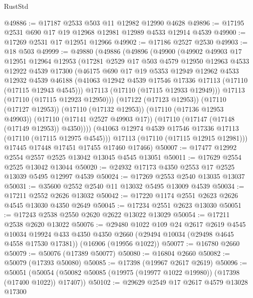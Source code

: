 \begin{lexlean}{RustStd}
\begin{coremodule}
@49886 := @17187 @2533 @503 @11 @12982 @12990 @4628
@49896 := @17195 @2531 @690 @17 @19 @12968 @12981 @12989 @4533 @12914 @4539
@49900 := @17269 @2531 @17 @12951 @12966
@49902 := @17186 @2527 @2530
@49903 := @18 @503
@49999 := @49880
    (@49886
      (@49896
        (@49900
          (@49902
            @49903
            @17
            @12951
            @12964
            @12953
            (@17281
              @2529
              @17
              @503
              @4579
              @12950
              @12963
              @4533
              @12922
              @4539
              @17300
              (@46175
                @690
                @17
                @19
                @5353
                @12949
                @12962
                @4533
                @12932
                @4539
                @46188
                (@41063 @12942 @4539 @17546 @17336 @17113 (@17110 (@17115 @12943 @4545)))
                @17113
                (@17110 (@17115 @12933 @12949)))
              @17113
              (@17110 (@17115 @12923 @12950)))
            (@17122 (@17123 @12953))
            (@17110 (@17127 @12953))
            (@17110 (@17132 @12953))
            (@17110 (@17136 @12953 @49903))
            (@17110 (@17141 @2527 @49903 @17))
            (@17110 (@17147 (@17148 (@17149 @12953)) @4350))))
        (@41063 @12974 @4539 @17546 @17336 @17113 (@17110 (@17115 @12975 @4545)))
        @17113
        (@17110 (@17115 @12915 @12981)))
      @17445
      @17448
      @17451
      @17455
      @17460
      @17466)
@50007 := @17477 @12992 @2554 @2557 @2525 @13042 @13045 @4545 @13051
@50011 := @17629 @2554 @2525 @13042 @13044
@50020 := @24932 @17173 @4350 @2553 @17 @2525 @13039 @5495 @12997 @4539
@50024 := @17269 @2553 @2540 @13035 @13037
@50031 := @35600 @2552 @2540 @11 @13032 @5495 @13009 @4539
@50034 := @17211 @2552 @2626 @13032
@50042 := @17220 @1174 @2551 @2623 @2626 @4545 @13030 @4350 @2649
@50045 := @17234 @2551 @2623 @13030
@50051 := @17243 @2538 @2550 @2620 @2622 @13022 @13029
@50054 := @17211 @2538 @2620 @13022
@50076 := @29480
    @1022
    @109
    @24
    @2617
    @2619
    @4545
    @10034
    @19924
    @433
    @4350
    @4350
    @2660
    (@29494 @10034 (@29498 @4645 @4558 @17530 @17381))
    (@16906 (@19956 @1022))
@50077 := @16780 @2660
@50079 := @50076 (@17389 @50077)
@50080 := @16804 @2660
@50082 := @50079 (@17393 @50080)
@50085 := @17398 (@19967 @2617 @2619)
@50096 := @50051
    (@50054 (@50082 @50085 (@19975 (@19977 @1022 @19980)) (@17398 (@17400 @1022)) @17407))
@50102 := @29629 @2549 @17 @2617 @4579 @13028 @17300

\end{coremodule}
\end{lexlean}
